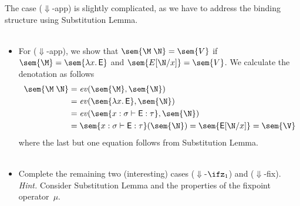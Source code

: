 \begin{frame}
  The case ($\Downarrow$-app) is slightly complicated, as we have to address
  the binding structure using Substitution Lemma.  
  \\~\\
  \begin{itemize}
      \item For ($\Downarrow$-app), we show that $\sem{\M\;\N} = \sem{V}$
        if $\sem{\M} = \sem{\lambda x.\, \mathsf{E}}$ and $\sem{E[\N/x]} =
        \sem{V}$. We calculate the denotation as follows
        \begin{align*}
          \sem{\M\;\N} & = \mathit{ev}(\sem{\M}, \sem{\N}) \\
          & = \mathit{ev}(\sem{\lambda x.\, \mathsf{E}}, 
          \sem{\N}) \\
          & = \mathit{ev}(\sem{x : \sigma \vdash \mathsf{E} : \tau},
          \sem{\N}) \\
          & = \sem{x : \sigma \vdash \mathsf{E} : \tau}(\sem{\N})
          = \sem{\mathsf{E}[\N/x]} = \sem{\V}
        \end{align*}
        where the last but one equation follows from Substitution Lemma.
        \\~\\
      \item Complete the remaining two (interesting) cases
        ($\Downarrow$-$\ifz_1$) and ($\Downarrow$-fix).
        \emph{Hint.} Consider Substitution Lemma and
        the properties of the fixpoint operator~$\mu$.
    \end{itemize}
\end{frame}

